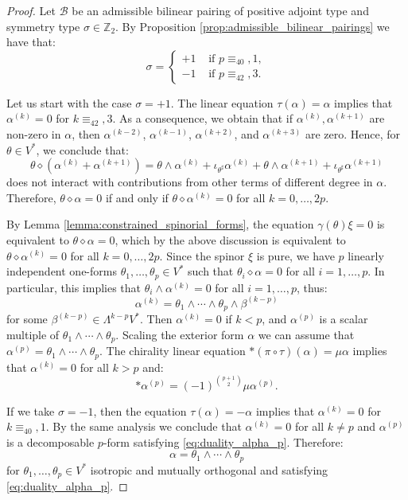 \documentclass[10pt,reqno]{amsart}
\theoremstyle{definition}
\theoremstyle{remark}
\newcommand{\Z}{\mathbb{Z}}
\begin{document}
\begin{proof}
    Let $\mathscr{B}$ be an admissible bilinear pairing of positive adjoint type and symmetry type $\sigma\in\Z_2$. By Proposition \ref{prop:admissible_bilinear_pairings} we have that: $$\sigma=\begin{cases}
        +1&\mbox{ if }p\equiv_40,1,\\
        -1&\mbox{ if }p\equiv_42,3.
    \end{cases}$$
    
    Let us start with the case $\sigma=+1$. The linear equation $\tau(\alpha)=\alpha$ implies that $\alpha^{(k)}=0$ for $k\equiv_42,3$. As a consequence, we obtain that if $\alpha^{(k)},\alpha^{(k+1)}$ are non-zero in $\alpha$, then $\alpha^{(k-2)}$, $\alpha^{(k-1)}$, $\alpha^{(k+2)}$, and $\alpha^{(k+3)}$ are zero. Hence, for $\theta\in V^*$, we conclude that: $$\theta\diamond(\alpha^{(k)}+\alpha^{(k+1)})=\theta\wedge\alpha^{(k)}+\iota_{\theta^\sharp}\alpha^{(k)}+\theta\wedge\alpha^{(k+1)}+\iota_{\theta^\sharp}\alpha^{(k+1)}$$ does not interact with contributions from other terms of different degree in $\alpha$. Therefore, $\theta\diamond\alpha=0$ if and only if $\theta\diamond\alpha^{(k)}=0$ for all $k=0,\ldots,2p$.\medskip
    
    By Lemma \ref{lemma:constrained_spinorial_forms}, the equation $\gamma(\theta)\xi=0$ is equivalent to $\theta\diamond\alpha=0$, which by the above discussion is equivalent to $\theta\diamond\alpha^{(k)}=0$ for all $k=0,\ldots,2p$. Since the spinor $\xi$ is pure, we have $p$ linearly independent one-forms $\theta_1,\ldots,\theta_p\in V^*$ such that $\theta_i\diamond\alpha=0$ for all $i=1,\ldots,p$. In particular, this implies that $\theta_i\wedge\alpha^{(k)}=0$ for all $i=1,\ldots,p$, thus: $$\alpha^{(k)}=\theta_1\wedge\cdots\wedge\theta_p\wedge\beta^{(k-p)}$$ for some $\beta^{(k-p)}\in\Lambda^{k-p}V^*$. Then $\alpha^{(k)}=0$ if $k<p$, and $\alpha^{(p)}$ is a scalar multiple of $\theta_1\wedge\cdots\wedge\theta_p$. Scaling the exterior form $\alpha$ we can assume that $\alpha^{(p)}=\theta_1\wedge\cdots\wedge\theta_p$. The chirality linear equation $*(\pi\circ\tau)(\alpha)=\mu\alpha$ implies that $\alpha^{(k)}=0$ for all $k>p$ and: \begin{equation}\label{eq:duality_alpha_p}
        *\alpha^{(p)}=(-1)^{\binom{p+1}{2}}\mu\alpha^{(p)}.
    \end{equation}

    If we take $\sigma=-1$, then the equation $\tau(\alpha)=-\alpha$ implies that $\alpha^{(k)}=0$ for $k\equiv_40,1$. By the same analysis we conclude that $\alpha^{(k)}=0$ for all $k\neq p$ and $\alpha^{(p)}$ is a decomposable $p$-form satisfying \eqref{eq:duality_alpha_p}. Therefore: $$\alpha=\theta_1\wedge\cdots\wedge\theta_p$$ for $\theta_1,\ldots,\theta_p\in V^*$ isotropic and mutually orthogonal and satisfying \eqref{eq:duality_alpha_p}.\medskip
    

\end{proof}
\end{document}
